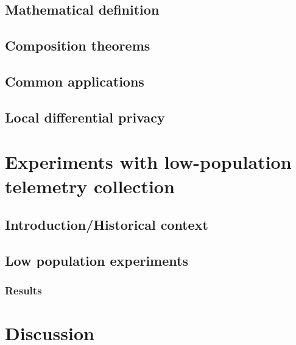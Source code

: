 \documentclass[12pt]{article}
\begin{document}
\subsection{Mathematical definition}

\subsection{Composition theorems}

\subsection{Common applications}

\subsection{Local differential privacy}

\section{Experiments with low-population telemetry collection}

\subsection{Introduction/Historical context}

\subsection{Low population experiments}

\subsubsection{Results}

\section{Discussion}

\cite{test}




\end{document}
